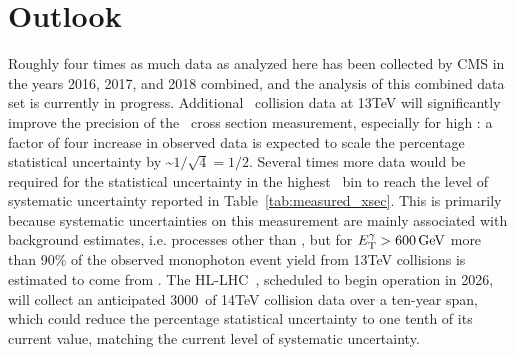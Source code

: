 \section{Outlook} \label{sec:conclusions_outlook}
Roughly four times as much data as analyzed here has been collected by CMS in the years 2016, 2017, and 2018 combined,
and the analysis of this combined data set is currently in progress. Additional \Pp\Pp\ collision data at 13\unit{TeV} will significantly
improve the precision of the \zinvg\ cross section measurement, especially for high \pTgamma:
a factor of four increase in observed data is expected to scale the percentage statistical uncertainty by \textasciitilde$1/\sqrt{4} = 1/2$.
Several times more data would be required for the statistical uncertainty in the highest \pTgamma\ bin to reach the level of systematic uncertainty
reported in Table~\ref{tab:measured_xsec}. This is primarily because systematic uncertainties on this measurement are mainly associated with
background estimates, i.e. processes other than \zinvg, but for $\ETgamma > 600\unit{GeV}$ more than 90\% of the observed monophoton event yield
from 13\unit{TeV} collisions is estimated to come from \zinvg. The HL-LHC~\cite{ref:HLLHC}, scheduled to begin operation in 2026, will collect an anticipated
3000\fbinv\ of 14\unit{TeV} collision data over a ten-year span, which could reduce the percentage statistical uncertainty to one tenth of its
current value, matching the current level of systematic uncertainty.

